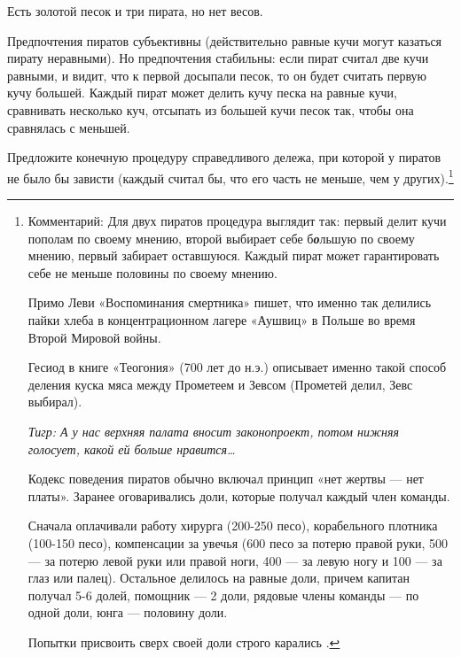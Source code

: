 \begin{problem}
\begin{source} \cite{brams:efcdp} \end{source}
Есть золотой песок и три пирата, но нет весов.\par
Предпочтения пиратов субъективны (действительно равные кучи могут казаться пирату неравными). Но предпочтения стабильны: если пират считал две кучи равными,  и видит, что к первой досыпали песок, то он будет считать первую кучу большей. Каждый пират может делить кучу песка на равные кучи, сравнивать несколько куч, отсыпать из большей кучи песок так, чтобы она сравнялась с меньшей.\par

Предложите конечную процедуру справедливого дележа, при которой у пиратов не было бы зависти (каждый считал бы, что его часть не меньше, чем у других).\footnote{ Комментарий: Для двух пиратов процедура выглядит так: первый делит кучи пополам по своему мнению, второй выбирает себе б{\bf {\it о}}льшую по своему мнению, первый забирает оставшуюся. Каждый пират может гарантировать себе не меньше половины по своему мнению. \par
Примо Леви «Воспоминания смертника» пишет, что именно так делились пайки хлеба в концентрационном лагере «Аушвиц» в Польше во время Второй Мировой войны. \par
Гесиод в книге «Теогония» (700 лет до н.э.) описывает именно такой способ деления куска мяса между Прометеем и Зевсом (Прометей делил, Зевс выбирал). \par
{\it Тигр: А у нас верхняя палата вносит законопроект, потом нижняя голосует, какой ей больше нравится\ldots }

Кодекс поведения пиратов обычно включал принцип «нет жертвы — нет платы». Заранее оговаривались доли, которые получал каждый член команды.\par
Сначала оплачивали работу хирурга (200-250 песо), корабельного плотника (100-150 песо), компенсации за увечья (600 песо за потерю правой руки, 500 — за потерю левой руки или правой ноги, 400 — за левую ногу и 100 — за глаз или палец). Остальное делилось на равные доли, причем капитан получал 5-6 долей, помощник — 2 доли, рядовые члены команды  — по одной доли, юнга — половину доли.\par
Попытки присвоить сверх своей доли строго карались \cite{brams:dps}. }



\begin{sol}

\end{sol}
\end{problem}



